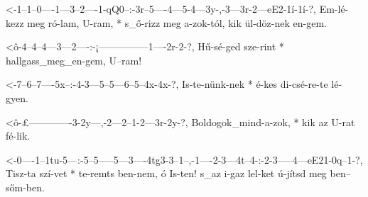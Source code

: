 

  {<-1--1--0----1---3--2----1-qQ0--:-3r--5----4---5-4---3y-,-3---3r-2---eE2-1í-1í-?,}
  {  Em-lé-kezz meg ró-lam, U-ram, * s_ő-rizz meg a-zok-tól, kik ül-döz-nek en-gem.}


  {<ô-4--4--4---3---2----:-¡---------------1----2r-2-?,}
  {   Hű-sé-ged sze-rint * hallgass_meg_en-gem, U--ram!}

  {<-7--6--7----5x--:-4-3---5--5---6--5--4x-4x-?,}
  {  Is-te-nünk-nek * é-kes di-csé-re-te lé-gyen.}


  {<ô-£-------------3-2y---,-2---2--1-2---3r-2y-?,}
  {   Boldogok_mind-a-zok, * kik az U-rat fé-lik.}



  {<-0----1--1tu-5---:-5--5-----5---3----4tg3-3--1--,-1----2-3---4t--4-:-2-3-----4---eE21-0q--1-?,}
  {  Tisz-ta szí-vet * te-remts ben-nem, ó    Is-ten! s_az i-gaz lel-ket ú-jítsd meg ben--sőm-ben.}


